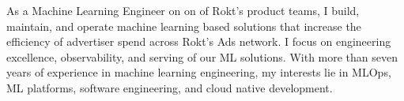 

\begin{cvparagraph}
\begin{flushleft}
As a Machine Learning Engineer on on of Rokt's product teams, I build, maintain, and operate machine learning based solutions that increase the efficiency of advertiser spend across Rokt's Ads network. I focus on engineering excellence, observability, and serving of our ML solutions. With more than seven years of experience in machine learning engineering, my interests lie in MLOps, ML platforms, software engineering, and cloud native development.
\end{flushleft}
\end{cvparagraph}
